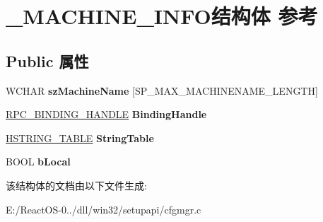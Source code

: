 \hypertarget{struct___m_a_c_h_i_n_e___i_n_f_o}{}\section{\+\_\+\+M\+A\+C\+H\+I\+N\+E\+\_\+\+I\+N\+F\+O结构体 参考}
\label{struct___m_a_c_h_i_n_e___i_n_f_o}
\subsection*{Public 属性}
\begin{DoxyCompactItemize}
\item 
\mbox{\label{struct___m_a_c_h_i_n_e___i_n_f_o_a46b01670892cabd78cbc3bf3758ca3d7}} 
W\+C\+H\+AR {\bfseries sz\+Machine\+Name} \mbox{[}S\+P\+\_\+\+M\+A\+X\+\_\+\+M\+A\+C\+H\+I\+N\+E\+N\+A\+M\+E\+\_\+\+L\+E\+N\+G\+TH\mbox{]}
\item 
\mbox{\label{struct___m_a_c_h_i_n_e___i_n_f_o_ab727f49708d867d9c4e2e3559238c9cb}} 
\hyperlink{interfacevoid}{R\+P\+C\+\_\+\+B\+I\+N\+D\+I\+N\+G\+\_\+\+H\+A\+N\+D\+LE} {\bfseries Binding\+Handle}
\item 
\mbox{\label{struct___m_a_c_h_i_n_e___i_n_f_o_ab122a93237d12b25a9a6e93519e28d5b}} 
\hyperlink{interfacevoid}{H\+S\+T\+R\+I\+N\+G\+\_\+\+T\+A\+B\+LE} {\bfseries String\+Table}
\item 
\mbox{\label{struct___m_a_c_h_i_n_e___i_n_f_o_acca3d901b9ad134c185ce7071d431580}} 
B\+O\+OL {\bfseries b\+Local}
\end{DoxyCompactItemize}


该结构体的文档由以下文件生成\+:\begin{DoxyCompactItemize}
\item 
E\+:/\+React\+O\+S-\/0../dll/win32/setupapi/cfgmgr.\+c\end{DoxyCompactItemize}
